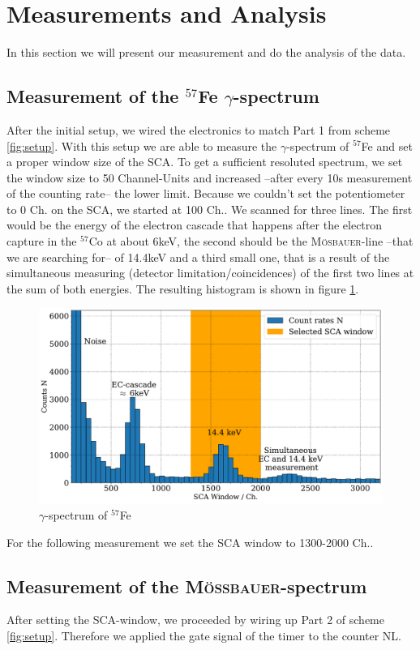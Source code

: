 \documentclass[11pt,a4paper,notitlepage]{scrartcl}
\begin{document}
\section{Measurements and Analysis}
In this section we will present our measurement and do the analysis of the data. 
\subsection{Measurement of the $^{57}$Fe $\gamma$-spectrum} 
After the initial setup, we wired the electronics to match Part 1 from scheme \ref{fig:setup}. With this setup we are able to measure the $\gamma$-spectrum of $^{57}$Fe and set a proper window size of the SCA.
To get a sufficient resoluted spectrum, we set the window size to 50 Channel-Units and increased --after every 10s measurement of the counting rate-- the lower limit. Because we couldn't set the potentiometer to 0 Ch. on the SCA, we started at 100 Ch.. We scanned for three lines. The first would be the energy of the electron cascade that happens after the electron capture in the $^{57}$Co at about 6keV, the second should be the \textsc{Mösbauer}-line --that we are searching for-- of 14.4keV and a third small one, that is a result of the simultaneous measuring (detector limitation/coincidences) of the first two lines at the sum of both energies. The resulting histogram is shown in figure \ref{fig:SCA}.

\begin{figure}[H]
	\includegraphics[width=\linewidth]{figs/SCA.pdf}
	\caption{$\gamma$-spectrum of $^{57}$Fe}\label{fig:SCA}
\end{figure}

For the following measurement we set the SCA window to 1300-2000 Ch..

\subsection{Measurement of the \textsc{Mö\ss bauer}-spectrum}\label{sec:doublelinewidth}
After setting the SCA-window, we proceeded by wiring up Part 2 of scheme \ref{fig:setup}. Therefore we applied the gate signal of the timer to the counter NL.
\end{document}

